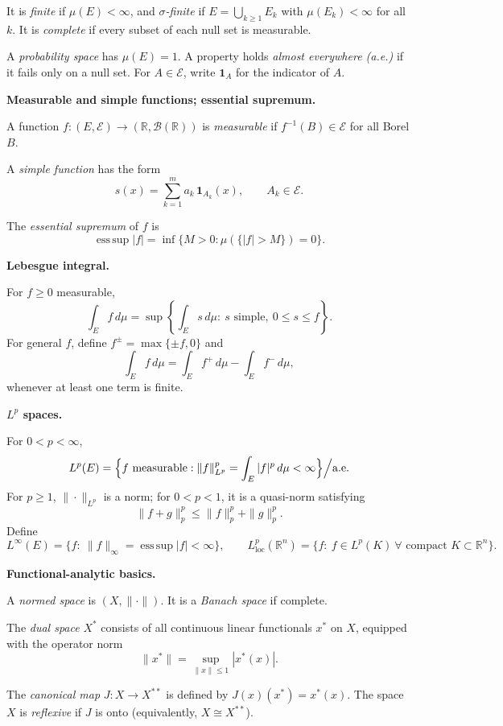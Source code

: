 \documentclass[12pt,a4paper]{article}
\theoremstyle{plain}
\theoremstyle{definition}
\theoremstyle{remark}
\theoremstyle{remark}
\theoremstyle{definition}
\begin{document}
\medskip
It is \emph{finite} if $\mu(E)<\infty$, and \emph{$\sigma$-finite} if 
$E=\bigcup_{k\ge1}E_k$ with $\mu(E_k)<\infty$ for all $k$.
It is \emph{complete} if every subset of each null set is measurable.

\medskip
A \emph{probability space} has $\mu(E)=1$.  
A property holds \emph{almost everywhere (a.e.)} if it fails only on a null set.
For $A\in\mathcal{E}$, write $\mathbf{1}_A$ for the indicator of $A$.

\bigskip
\textbf{Measurable and simple functions; essential supremum.}

A function $f:(E,\mathcal{E})\to(\mathbb{R},\mathcal{B}(\mathbb{R}))$ is
\emph{measurable} if $f^{-1}(B)\in\mathcal{E}$ for all Borel $B$.

A \emph{simple function} has the form
\[
s(x)=\sum_{k=1}^m a_k\,\mathbf{1}_{A_k}(x),
\qquad A_k\in\mathcal{E}.
\]

The \emph{essential supremum} of $f$ is
\[
\operatorname*{ess\,sup}|f|
=\inf\{M>0:\mu(\{|f|>M\})=0\}.
\]

\bigskip
\textbf{Lebesgue integral.}

For $f\ge0$ measurable,
\[
\int_E f\,d\mu
= \sup\left\{\int_E s\,d\mu:\ s\text{ simple},\ 0\le s\le f\right\}.
\]
For general $f$, define $f^\pm=\max\{\pm f,0\}$ and
\[
\int_E f\,d\mu = \int_E f^+\,d\mu - \int_E f^-\,d\mu,
\]
whenever at least one term is finite.

\bigskip
\textbf{$L^p$ spaces.}

For $0<p<\infty$,
\[
L^p(E)=
\Bigl\{
f\text{ measurable}:
\|f\|_{L^p}^p=\int_E |f|^p\,d\mu <\infty
\Bigr\}\Big/\text{a.e.}
\]
For $p\ge1$, $\|\cdot\|_{L^p}$ is a norm;
for $0<p<1$, it is a quasi-norm satisfying
\[
\|f+g\|_p^p \le \|f\|_p^p + \|g\|_p^p.
\]
Define
\[
L^\infty(E)
=\{f:\ \|f\|_\infty=\operatorname*{ess\,sup}|f|<\infty\},
\qquad
L^p_{\mathrm{loc}}(\mathbb{R}^n)
=\{f:\ f\in L^p(K)\ \forall\text{ compact }K\subset\mathbb{R}^n\}.
\]

\bigskip
\textbf{Functional-analytic basics.}

A \emph{normed space} is $(X,\|\cdot\|)$.
It is a \emph{Banach space} if complete.

\medskip
The \emph{dual space} $X^*$ consists of all continuous linear functionals $x^*$ on $X$,
equipped with the operator norm
\[
\|x^*\| = \sup_{\|x\|\le1} |x^*(x)|.
\]

\medskip
The \emph{canonical map} $J:X\to X^{**}$ is defined by
$J(x)(x^*)=x^*(x)$.
The space $X$ is \emph{reflexive} if $J$ is onto (equivalently, $X\cong X^{**}$).
\end{document}
